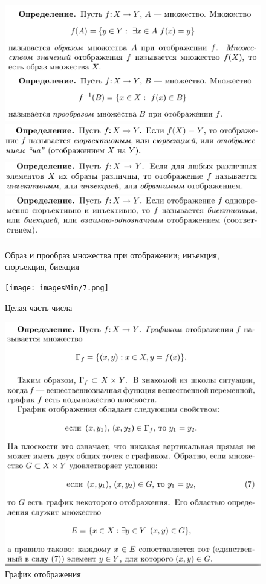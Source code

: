 \documentclass[12pt, a4paper]{article}
\begin{document}
\begin{figure}[h]
    \centering
    \caption{Образ и прообраз множества при отображении; инъекция, сюръекция, биекция}
    \includegraphics[width=0.8\linewidth]{imagesMin/6_1.png}
    \includegraphics[width=0.8\linewidth]{imagesMin/6_2.png}
    \includegraphics[width=0.8\linewidth]{imagesMin/6_3.png}
    \includegraphics[width=0.8\linewidth]{imagesMin/6_4.png}
\end{figure}
\begin{figure}[h]
    \centering
    \caption{Целая часть числа}
    \texttt{[image: imagesMin/7.png]}
\end{figure}
\begin{figure}[h]
    \centering
    \caption{График отображения}
    \includegraphics[width=0.8\linewidth]{imagesMin/8.png}
\end{figure}
\end{document}
